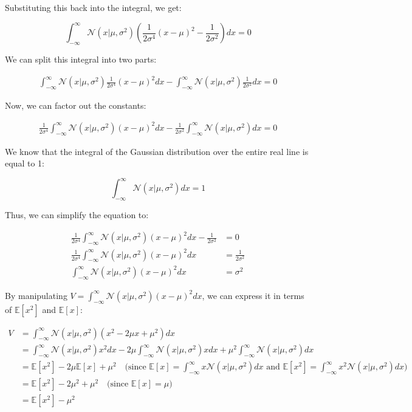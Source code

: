 \documentclass{article}
\begin{document}
\begin{tcolorbox}[breakable,colback=gray!5,colframe=gray!60,title=Solution]
Substituting this back into the integral, we get:

\[
\int_{-\infty}^{\infty} \mathcal{N}(x|\mu,\sigma^2) \left(\frac{1}{2\sigma^4} (x-\mu)^2 - \frac{1}{2\sigma^2}\right) dx = 0
\]

We can split this integral into two parts:

\begin{align*}
\int_{-\infty}^{\infty} \mathcal{N}(x|\mu,\sigma^2) \frac{1}{2\sigma^4} (x-\mu)^2 dx - \int_{-\infty}^{\infty} \mathcal{N}(x|\mu,\sigma^2) \frac{1}{2\sigma^2} dx = 0
\end{align*}

Now, we can factor out the constants:

\begin{align*}
\frac{1}{2\sigma^4} \int_{-\infty}^{\infty} \mathcal{N}(x|\mu,\sigma^2) (x-\mu)^2 dx - \frac{1}{2\sigma^2} \int_{-\infty}^{\infty} \mathcal{N}(x|\mu,\sigma^2) dx = 0
\end{align*}

We know that the integral of the Gaussian distribution over the entire real line is equal to 1:

\[\int_{-\infty}^{\infty} \mathcal{N}(x|\mu,\sigma^2) dx = 1\]

Thus, we can simplify the equation to:

\begin{align*}
\frac{1}{2\sigma^4} \int_{-\infty}^{\infty} \mathcal{N}(x|\mu,\sigma^2) (x-\mu)^2 dx - \frac{1}{2\sigma^2} &= 0 \\
\frac{1}{2\sigma^4} \int_{-\infty}^{\infty} \mathcal{N}(x|\mu,\sigma^2) (x-\mu)^2 dx &= \frac{1}{2\sigma^2} \\
\int_{-\infty}^{\infty} \mathcal{N}(x|\mu,\sigma^2) (x-\mu)^2 dx &= \sigma^2
\end{align*}

By manipulating $V = \int_{-\infty}^{\infty} \mathcal{N}(x|\mu,\sigma^2) (x-\mu)^2 dx$, we can express it in terms of $\mathbb{E}[x^2]$ and $\mathbb{E}[x]$:

\begin{align*}
V &= \int_{-\infty}^{\infty} \mathcal{N}(x|\mu,\sigma^2) (x^2 - 2\mu x + \mu^2) dx \\
&= \int_{-\infty}^{\infty} \mathcal{N}(x|\mu,\sigma^2) x^2 dx - 2\mu \int_{-\infty}^{\infty} \mathcal{N}(x|\mu,\sigma^2) x dx + \mu^2 \int_{-\infty}^{\infty} \mathcal{N}(x|\mu,\sigma^2) dx \\
&= \mathbb{E}[x^2] - 2\mu \mathbb{E}[x] + \mu^2 \quad \text{(since $\mathbb{E}[x] = \int_{-\infty}^{\infty} x \mathcal{N}(x|\mu,\sigma^2) dx$ and $\mathbb{E}[x^2] = \int_{-\infty}^{\infty} x^2 \mathcal{N}(x|\mu,\sigma^2) dx$)} \\
&= \mathbb{E}[x^2] - 2\mu^2 + \mu^2  \quad \text{(since $\mathbb{E}[x] = \mu$)} \\
&= \mathbb{E}[x^2] - \mu^2
\end{align*}


\end{tcolorbox}
\end{document}
